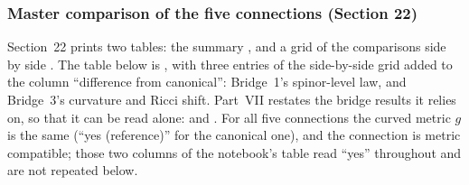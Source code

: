 \subsubsection{Master comparison of the five connections (Section 22)}
\label{csc:master}\label{sec:3.8.11}

Section~22 prints two tables: the summary , and a grid of the
comparisons side by side . The table below is ,
with three entries of the side-by-side grid added to the column ``difference from canonical'':
Bridge~1's spinor-level law, and Bridge~3's curvature and Ricci shift. Part~VII restates the bridge
results it relies on, so that it can be read alone:  
and . For all five connections
the curved metric $g$ is the same (``yes (reference)'' for the canonical one), and the connection
is metric compatible; those two columns of the notebook's table read ``yes'' throughout and are
not repeated below.

